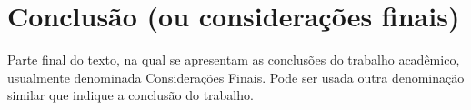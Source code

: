 \chapter{Conclusão (ou considerações finais)}\label{cap:conclusoeseperspectivas}

Parte final do texto, na qual se apresentam as conclusões do trabalho acadêmico, usualmente denominada Considerações Finais. Pode ser usada outra denominação similar que indique a conclusão do trabalho.

